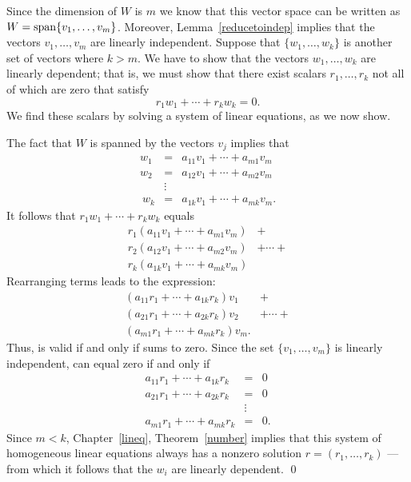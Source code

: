\proof Since the dimension of $W$ is $m$ we know that
this vector space can be written as $W={\rm span}\{v_1,\ldots,v_m\}$.
Moreover, Lemma~\ref{reducetoindep} implies that the vectors
$v_1,\ldots,v_m$ are linearly independent.  Suppose that
$\{w_1,\ldots,w_k\}$ is another set of vectors where $k>m$.
We have to show that the vectors $w_1,\ldots,w_k$ are linearly
dependent; that is, we must show that there exist scalars
$r_1,\ldots,r_k$ not all of which are zero that satisfy
\begin{equation} \label{independence1}
r_1w_1 + \cdots + r_kw_k = 0.
\end{equation}
We find these scalars by solving a system of linear equations, as
we now show.

The fact that $W$ is spanned by the vectors $v_j$ implies that
\begin{eqnarray*}
w_1 & = & a_{11}v_1 + \cdots + a_{m1}v_m\ \\
w_2 & = & a_{12}v_1 + \cdots + a_{m2}v_m\ \\
 & \vdots & \\\
w_k & = & a_{1k}v_1 + \cdots + a_{mk}v_m.
\end{eqnarray*}
It follows that $r_1w_1 + \cdots + r_kw_k$ equals
\[
\begin{array}{ll}
r_1(a_{11}v_1 + \cdots + a_{m1}v_m) & +  \\
r_2(a_{12}v_1 + \cdots + a_{m2}v_m) & + \cdots + \\
r_k(a_{1k}v_1 + \cdots + a_{mk}v_m) &
\end{array}
\]
Rearranging terms leads to the expression:
\begin{equation}   \label{e:r1v1etc}
\begin{array}{ll}
(a_{11}r_1 + \cdots + a_{1k}r_k)v_1\ & + \\
(a_{21}r_1 + \cdots + a_{2k}r_k)v_2\ & + \cdots + \\
(a_{m1}r_1 + \cdots + a_{mk}r_k)v_m. &
\end{array}
\end{equation}
Thus,  is valid if and only if 
sums to zero.  Since the set $\{v_1,\ldots,v_m\}$ is linearly
independent, \Ref{e:r1v1etc} can equal zero if and only if
\begin{eqnarray*}
a_{11}r_1 + \cdots + a_{1k}r_k & = & 0\ \\
a_{21}r_1 + \cdots + a_{2k}r_k & = & 0\ \\
          & \vdots &   \\
a_{m1}r_1 + \cdots + a_{mk}r_k & = & 0.
\end{eqnarray*}
Since $m<k$, Chapter~\ref{lineq}, Theorem~\ref{number} implies that
this system of homogeneous linear equations always has a nonzero
solution $r=(r_1,\ldots,r_k)$ --- from which it follows that the
$w_i$ are linearly dependent.  \qed

